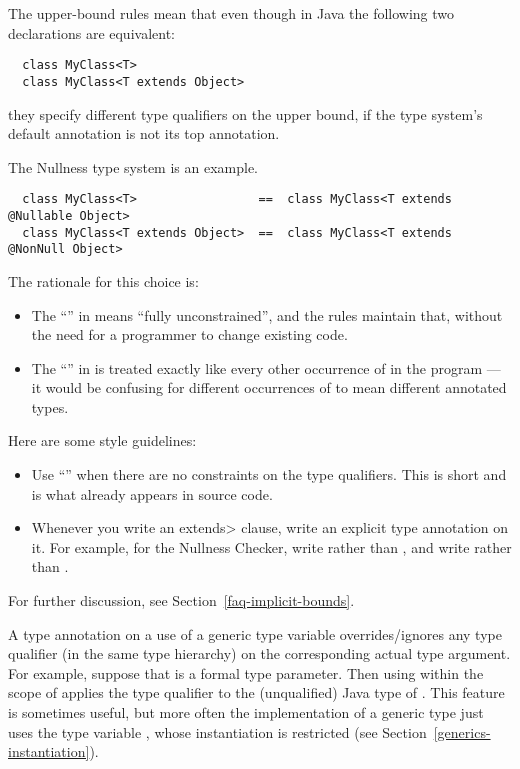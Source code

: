 The upper-bound rules mean that even though in Java the following two
declarations are equivalent:

\begin{Verbatim}
  class MyClass<T>
  class MyClass<T extends Object>
\end{Verbatim}

\noindent
they specify different type qualifiers on the upper bound,
if the type system's default annotation is not its top annotation.

The Nullness type system is an example.

\begin{Verbatim}
  class MyClass<T>                 ==  class MyClass<T extends @Nullable Object>
  class MyClass<T extends Object>  ==  class MyClass<T extends @NonNull Object>
\end{Verbatim}

The rationale for this choice is:
\begin{itemize}
\item
  The ``'' in  means ``fully unconstrained'',
  and the rules maintain that, without the need for a programmer to
  change existing code.
\item
  The ``'' in  is treated
  exactly like every other occurrence of  in the program ---
  it would be confusing for different occurrences of  to mean
  different annotated types.
\end{itemize}

Here are some style guidelines:
\begin{itemize}
\item
  Use ``'' when there are no constraints on the type qualifiers.
  This is short and is what already appears in source code.
\item
  Whenever you write an \<extends> clause, write an explicit type
  annotation on it.  For example, for the Nullness Checker, write
   rather than , and write  rather than .
\end{itemize}

For further discussion, see Section~\ref{faq-implicit-bounds}.



A type annotation on a use of a generic type variable overrides/ignores any type
qualifier (in the same type hierarchy) on the corresponding actual type
argument.  For example, suppose that  is a formal type parameter.
Then using  within the scope of  applies the type
qualifier  to the (unqualified) Java type of \@.
This feature is sometimes useful, but more often the implementation of a
generic type just uses the type variable , whose instantiation is
restricted (see Section~\ref{generics-instantiation}).

